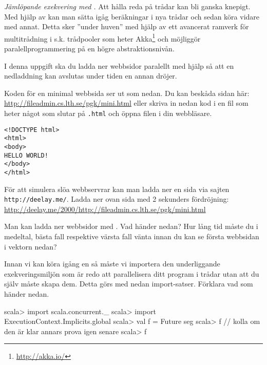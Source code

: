 \Task \emph{Jämlöpande exekvering med .} Att hålla reda på trådar kan bli ganska knepigt. Med hjälp av  kan man sätta igåg beräkningar i nya trådar och sedan köra vidare med annat. Detta sker ''under huven'' med hjälp av ett avancerat ramverk för multitrådning i s.k. trådpooler som heter Akka\footnote{\url{http://akka.io/}} och möjliggör paralellprogrammering på en högre abstraktionsnivån. 

I denna uppgift ska du ladda ner webbsidor paralellt med hjälp  så att en nedladdning kan avslutas under tiden en annan dröjer.  

\Subtask Koden för en minimal webbsida ser ut som nedan. Du kan beskåda sidan här: \url{http://fileadmin.cs.lth.se/pgk/mini.html} eller skriva in nedan kod i en fil som heter något som slutar på \texttt{.html} och öppna filen i din webbläsare.

\begin{verbatim}
<!DOCTYPE html>
<html>
<body>
HELLO WORLD!
</body>
</html>
\end{verbatim}

\Subtask För att simulera slöa webbservrar kan man ladda ner en sida via sajten \texttt{http://deelay.me/}. Ladda ner ovan sida med 2 sekunders fördröjning:\\
\url{http://deelay.me/2000/http://fileadmin.cs.lth.se/pgk/mini.html}

\Subtask Man kan ladda ner webbsidor med . Vad händer nedan? Hur lång tid måste du i medeltal, bästa fall respektive värsta fall vänta innan du kan se första webbsidan i vektorn  nedan?


\Subtask Innan vi kan köra igång en  så måste vi importera den underliggande exekveringsmiljön som är redo att parallelisera ditt program i trådar utan att du själv måste skapa dem. Detta görs med nedan import-satser. Förklara vad som händer nedan.
\begin{REPL}
scala> import scala.concurrent._ 
scala> import ExecutionContext.Implicits.global
scala> val f = Future{ seg }
scala> f   // kolla om den är klar annars prova igen senare
scala> f
\end{REPL}


